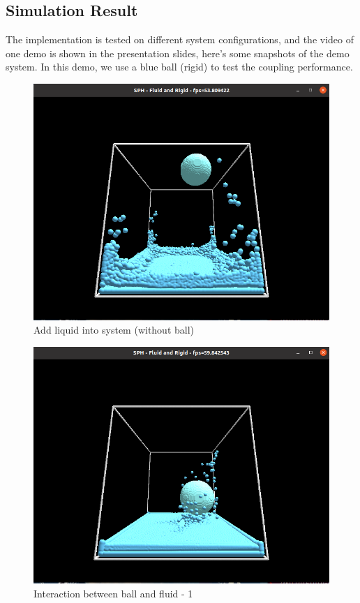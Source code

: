 \documentclass[acmtog]{acmart}
\begin{document}
\subsection{Simulation Result}
The implementation is tested on different system configurations, and the video of one demo is shown in the 
presentation slides, here's some snapshots of the demo system. In this demo, we use a blue ball (rigid) to 
test the coupling performance.
\begin{figure}[H]
    \centering
    \includegraphics[scale=0.2]{../1.png}
    \caption{Add liquid into system (without ball)}
\end{figure}

\begin{figure}[H]
    \centering
    \includegraphics[scale=0.2]{../2.png}
    \caption{Interaction between ball and fluid - 1}
\end{figure}
\end{document}
